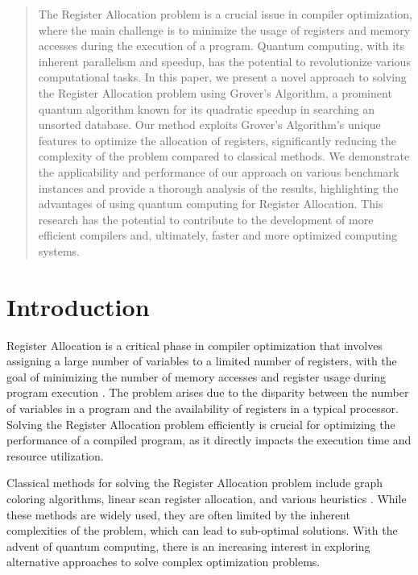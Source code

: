 \begin{abstract}
The Register Allocation problem is a crucial issue in compiler optimization, where the main challenge is to minimize the usage of registers and memory accesses during the execution of a program. Quantum computing, with its inherent parallelism and speedup, has the potential to revolutionize various computational tasks. In this paper, we present a novel approach to solving the Register Allocation problem using Grover's Algorithm, a prominent quantum algorithm known for its quadratic speedup in searching an unsorted database. Our method exploits Grover's Algorithm's unique features to optimize the allocation of registers, significantly reducing the complexity of the problem compared to classical methods. We demonstrate the applicability and performance of our approach on various benchmark instances and provide a thorough analysis of the results, highlighting the advantages of using quantum computing for Register Allocation. This research has the potential to contribute to the development of more efficient compilers and, ultimately, faster and more optimized computing systems.

\end{abstract}

\section{Introduction}

Register Allocation is a critical phase in compiler optimization that involves assigning a large number of variables to a limited number of registers, with the goal of minimizing the number of memory accesses and register usage during program execution \cite{register_allocation}. The problem arises due to the disparity between the number of variables in a program and the availability of registers in a typical processor. Solving the Register Allocation problem efficiently is crucial for optimizing the performance of a compiled program, as it directly impacts the execution time and resource utilization.

Classical methods for solving the Register Allocation problem include graph coloring algorithms, linear scan register allocation, and various heuristics \cite{classical_methods}. While these methods are widely used, they are often limited by the inherent complexities of the problem, which can lead to sub-optimal solutions. With the advent of quantum computing, there is an increasing interest in exploring alternative approaches to solve complex optimization problems.

